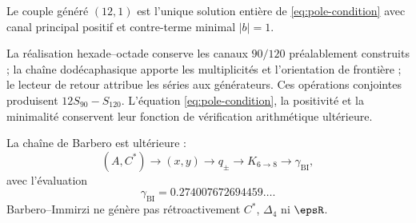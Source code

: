 \begin{proposition}
Le couple généré \((12,1)\) est l'unique solution entière de
\eqref{eq:pole-condition} avec canal principal positif et contre-terme
minimal \(|b|=1\).
\end{proposition}

La réalisation hexade--octade conserve les canaux \(90/120\)
préalablement construits ; la chaîne dodécaphasique apporte les multiplicités
et l'orientation de frontière ; le lecteur de retour attribue les séries aux
générateurs. Ces opérations conjointes produisent \(12S_{90}-S_{120}\).
L'équation \eqref{eq:pole-condition}, la positivité et la minimalité
conservent leur fonction de vérification arithmétique ultérieure.

La chaîne de Barbero est ultérieure :
\[
(A,C^*)\to(x,y)\to q_\pm
\to K_{6\to8}\to\gamma_{\mathrm{BI}},
\]
avec l'évaluation
\[
\gamma_{\mathrm{BI}}=0.274007672694459\ldots.
\]
Barbero--Immirzi ne génère pas rétroactivement \(C^*\), \(\Delta_4\) ni
\(\epsR\).

